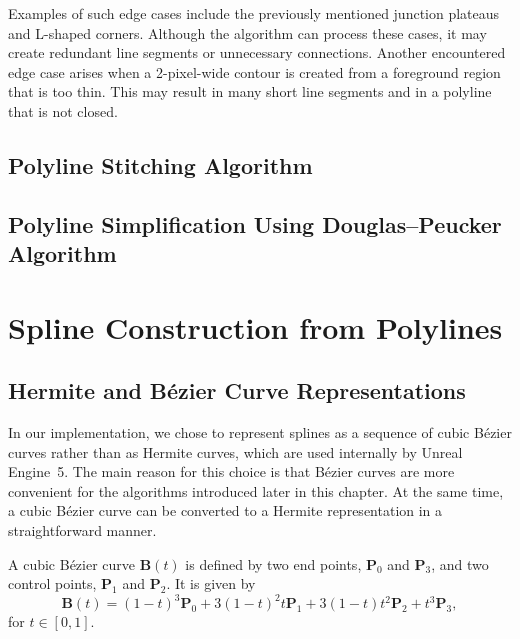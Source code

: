 Examples of such edge cases include the previously mentioned junction plateaus and L-shaped corners. Although the algorithm can process these cases, it may create redundant line segments or unnecessary connections. Another encountered edge case arises when a 2-pixel-wide contour is created from a foreground region that is too thin. This may result in many short line segments and in a polyline that is not closed.



\subsection{Polyline Stitching Algorithm}



\subsection{Polyline Simplification Using Douglas--Peucker Algorithm} %



\section{Spline Construction from Polylines}

\subsection{Hermite and B\'ezier Curve Representations}

In our implementation, we chose to represent splines as a sequence of cubic B\'ezier curves rather than as Hermite curves, which are used internally by Unreal Engine~5. The main reason for this choice is that B\'ezier curves are more convenient for the algorithms introduced later in this chapter. At the same time, a cubic B\'ezier curve can be converted to a Hermite representation in a straightforward manner.

A cubic B\'ezier curve $\mathbf{B}(t)$ is defined by two end points, $\mathbf{P}_0$ and $\mathbf{P}_3$, and two control points, $\mathbf{P}_1$ and $\mathbf{P}_2$. It is given by
\begin{equation}
	\mathbf{B}(t) = (1 - t)^3\mathbf{P}_0 + 3(1-t)^2t\mathbf{P}_1 + 3(1-t)t^2\mathbf{P}_2 + t^3\mathbf{P}_3,
\end{equation}
for $t \in [0,1]$.

